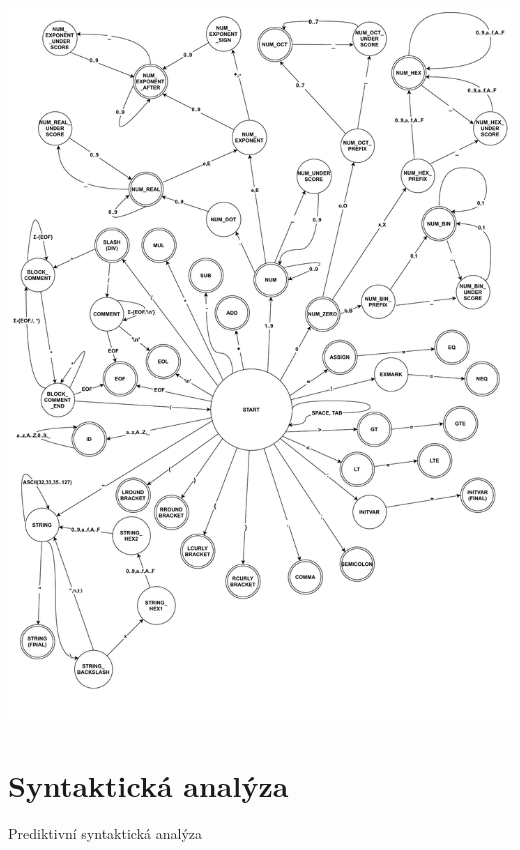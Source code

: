 \documentclass[a4paper, 11pt]{article}
\begin{document}
\includegraphics[width=\textwidth,height=\textheight,keepaspectratio]{Scanner_FSM_Graph.pdf}

\newpage

\section{Syntaktická analýza}
Prediktivní syntaktická analýza
\end{document}
